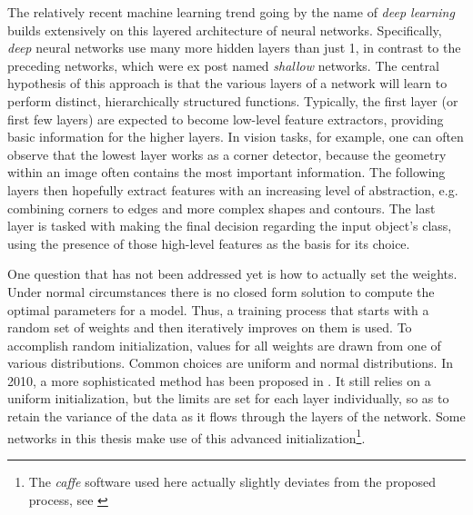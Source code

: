 \documentclass[11pt, a4paper]{article}
\begin{document}
The relatively recent machine learning trend going by the name of \emph{deep learning} builds extensively on this layered architecture of neural networks. Specifically, \emph{deep} neural networks use many more hidden layers than just 1, in contrast to the preceding networks, which were ex post named \emph{shallow} networks. The central hypothesis of this approach is that the various layers of a network will learn to perform distinct, hierarchically structured functions. Typically, the first layer (or first few layers) are expected to become low-level feature extractors, providing basic information for the higher layers. In vision tasks, for example, one can often observe that the lowest layer works as a corner detector, because the geometry within an image often contains the most important information. The following layers then hopefully extract features with an increasing level of abstraction, e.g. combining corners to edges and more complex shapes and contours. The last layer is tasked with making the final decision regarding the input object's class, using the presence of those high-level features as the basis for its choice.

One question that has not been addressed yet is how to actually set the weights. Under normal circumstances there is no closed form solution to compute the optimal parameters for a model. Thus, a training process that starts with a random set of weights and then iteratively improves on them is used. To accomplish random initialization, values for all weights are drawn from one of various distributions. Common choices are uniform and normal distributions. In 2010, a more sophisticated method has been proposed in \cite{glorot-understanding-deep-nn-training}. It still relies on a uniform initialization, but the limits are set for each layer individually, so as to retain the variance of the data as it flows through the layers of the network. Some networks in this thesis make use of this advanced initialization\footnote{The \emph{caffe} software used here actually slightly deviates from the proposed process, see \cite{caffe-xavier}}.
\end{document}
